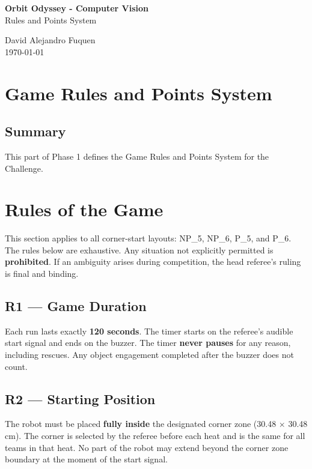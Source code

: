 \documentclass[a4]{article}
\begin{document}
\thispagestyle{fancy}

\begin{center}
    \textbf{\large Orbit Odyssey - Computer Vision} \\
    {Rules and Points System}
    
    \vspace{0.7em}

    David Alejandro Fuquen \\

    {\small \today}

\end{center}

\section*{Game Rules and Points System}

\subsection*{Summary}
This part of Phase 1 defines the Game Rules and Points System for the Challenge. 

\section*{Rules of the Game}
This section applies to all corner-start layouts: NP\_5, NP\_6, P\_5, and P\_6. The rules below are exhaustive. Any situation not explicitly permitted is \textbf{prohibited}. If an ambiguity arises during competition, the head referee's ruling is final and binding.

\subsection*{R1 --- Game Duration}
Each run lasts exactly \textbf{120 seconds}. The timer starts on the referee's audible start signal and ends on the buzzer. The timer \textbf{never pauses} for any reason, including rescues. Any object engagement completed after the buzzer does not count.

\subsection*{R2 --- Starting Position}
The robot must be placed \textbf{fully inside} the designated corner zone (30.48 $\times$ 30.48 cm). The corner is selected by the referee before each heat and is the same for all teams in that heat. No part of the robot may extend beyond the corner zone boundary at the moment of the start signal.
\end{document}
